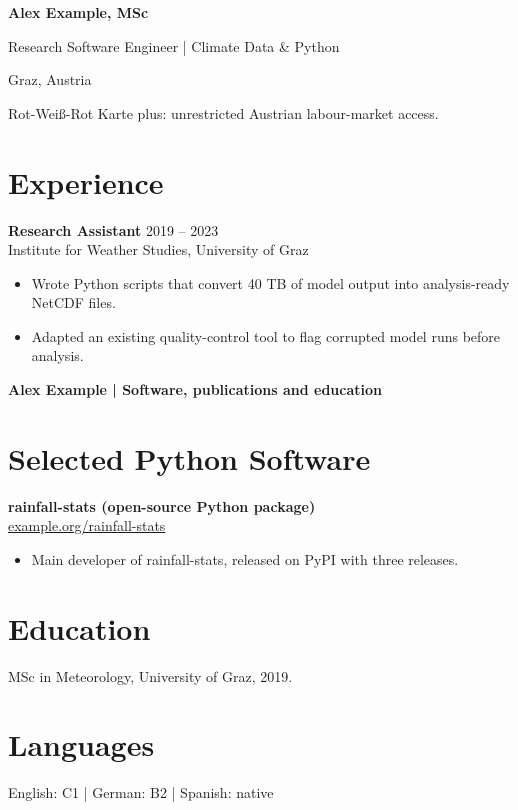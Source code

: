 \documentclass[10pt,a4paper]{article}
\begin{document}
\raggedright\setlength{\emergencystretch}{2em}
{\fontsize{28pt}{32pt}\selectfont\bfseries\color{ink} Alex Example, MSc}\par
\vspace{4pt}
{\fontsize{11pt}{14pt}\selectfont Research Software Engineer | Climate Data \& Python\par}
\vspace{4pt}
{\fontsize{11pt}{14pt}\selectfont
Graz, Austria\par}
\vspace{3pt}
{\fontsize{11pt}{14pt}\selectfont Rot-Weiß-Rot Karte plus: unrestricted Austrian labour-market access.\par}
\section{Experience}
\textbf{Research Assistant} \hfill 2019 – 2023\\Institute for Weather Studies, University of Graz
\begin{itemize}
\item Wrote Python scripts that convert 40 TB of model output into analysis-ready NetCDF files.
\item Adapted an existing quality-control tool to flag corrupted model runs before analysis.
\end{itemize}
\vspace{8pt}
{\large\bfseries Alex Example | Software, publications and education}
\section{Selected Python Software}
\textbf{rainfall-stats (open-source Python package)}\\
\href{https://example.org/rainfall-stats}{example.org/rainfall-stats}
\begin{itemize}
\item Main developer of rainfall-stats, released on PyPI with three releases.
\end{itemize}
\section{Education}
MSc in Meteorology, University of Graz, 2019.
\section{Languages}
English: C1 \enspace | \enspace German: B2 \enspace | \enspace Spanish: native
\end{document}
